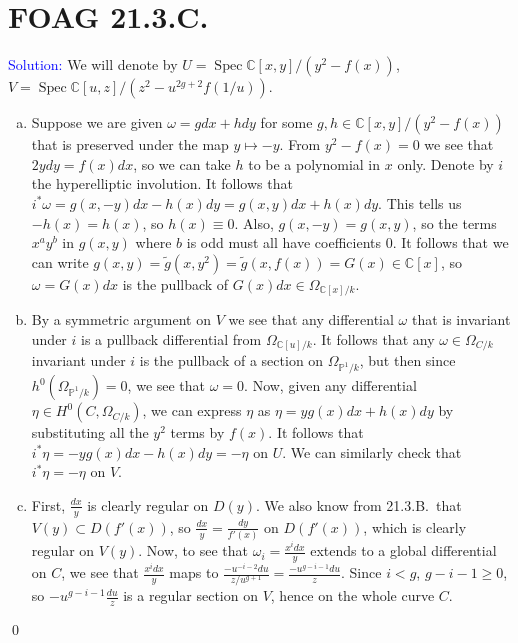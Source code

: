 \documentclass[11pt]{article}
\newcommand{\CC}{\mathbb{C}}
\newcommand{\PP}{\mathbb{P}}
\DeclareMathOperator{\Spec}{\operatorname{Spec}}
\newenvironment{solution}{\begin{trivlist}\item[]{\textcolor{blue}{Solution:}}}{\qed \end{trivlist}}
\begin{document}
\newpage

\section*{FOAG 21.3.C.}

\begin{solution}
    We will denote by $U = \Spec \CC[x,y]/(y^2 - f(x))$, $V = \Spec \CC[u,z]/(z^2 - u^{2g+2} f(1/u))$. 
    \begin{enumerate}[(a)]
        \item Suppose we are given $\omega = gdx + hdy$ for some $g, h \in \CC[x,y]/(y^2 - f(x))$ that is preserved under the map $y \mapsto -y$. From $y^2 - f(x) = 0$ we see that $2ydy = f(x) dx$, so we can take $h$ to be a polynomial in $x$ only. Denote by $i$ the hyperelliptic involution. It follows that $i^* \omega = g(x,-y) dx - h(x)dy = g(x,y) dx + h(x) dy$. This tells us $-h(x) = h(x)$, so $h(x) \equiv 0$. Also, $g(x,-y) = g(x,y)$, so the terms $x^ay^b$ in $g(x,y)$ where $b$ is odd must all have coefficients 0. It follows that we can write $g(x,y) = \tilde g(x,y^2) = \tilde g(x, f(x)) = G(x) \in \CC[x]$, so $\omega = G(x) dx$ is the pullback of $G(x) dx \in \Omega_{\CC[x]/k}$. 
        
        \item By a symmetric argument on $V$ we see that any differential $\omega$ that is invariant under $i$ is a pullback differential from $\Omega_{\CC[u]/k}$. It follows that any $\omega \in \Omega_{C/k}$ invariant under $i$ is the pullback of a section on $\Omega_{\PP^1/k}$, but then since $h^0(\Omega_{\PP^1/k}) = 0$, we see that $\omega = 0$. Now, given any differential $\eta \in H^0(C, \Omega_{C/k})$, we can express $\eta$ as $\eta = yg(x) dx + h(x) dy$ by substituting all the $y^2$ terms by $f(x)$. It follows that $i^* \eta = -y g(x) dx - h(x) dy = -\eta$ on $U$. We can similarly check that $i^*\eta = -\eta$ on $V$. 
        
        \item First, $\frac{dx}{y}$ is clearly regular on $D(y)$. We also know from 21.3.B.\ that $V(y) \subset D(f'(x))$, so $\frac{dx}{y} = \frac{dy}{f'(x)}$ on $D(f'(x))$, which is clearly regular on $V(y)$. Now, to see that $\omega_i = \frac{x^i dx}{y}$ extends to a global differential on $C$, we see that $\frac{x^i dx}{y}$ maps to $\frac{-u^{-i-2}du}{z/u^{g+1}} = \frac{-u^{g-i-1}du}{z}$. Since $i < g$, $g - i - 1 \geq 0$, so $-u^{g-i-1} \frac{du}{z}$ is a regular section on $V$, hence on the whole curve $C$. 
        

\end{enumerate}
\end{solution}
\end{document}
